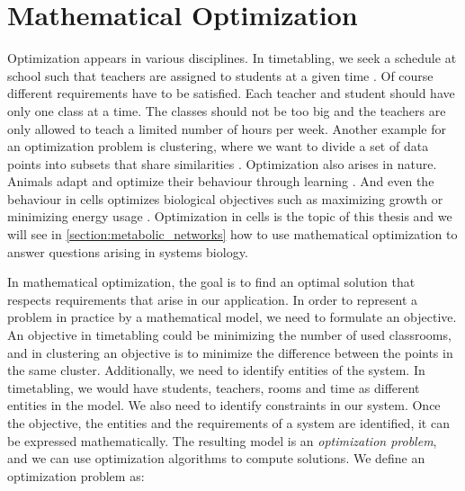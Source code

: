 \section{Mathematical Optimization} \label{section:optimization}
Optimization appears in various disciplines. 
In timetabling, we seek a schedule at school such that teachers are assigned to students at a given time \cite{timetabling}. Of course different requirements have to be satisfied. Each teacher and student should have only one class at a time. The classes should not be too big and the teachers are only allowed to teach a limited number of hours per week. 
Another example for an optimization problem is clustering, where we want to divide a set of data points into subsets that share similarities \cite{clustering}. 
Optimization also arises in nature. Animals adapt and optimize their behaviour through learning \cite{optimization_systems_biology}. And even the behaviour in cells optimizes biological objectives such as maximizing growth or minimizing energy usage \cite{intro_computational_systems_biology}. Optimization in cells is the topic of this thesis and we will see in \cref{section:metabolic_networks} how to use mathematical optimization to answer questions arising in systems biology.

In mathematical optimization, the goal is to find an optimal solution that respects requirements that arise in our application. In order to represent a problem in practice by a mathematical model, we need to formulate an objective. An objective in timetabling could be minimizing the number of used classrooms, and in clustering an objective is to minimize the difference between the points in the same cluster. Additionally, we need to identify entities of the system. In timetabling, we would have students, teachers, rooms and time as different entities in the model. We also need to identify constraints in our system. Once the objective, the entities and the requirements of a system are identified, it can be expressed mathematically.
The resulting model is an \textit{optimization problem}, and we can use optimization algorithms to compute solutions. 
We define an optimization problem as:

